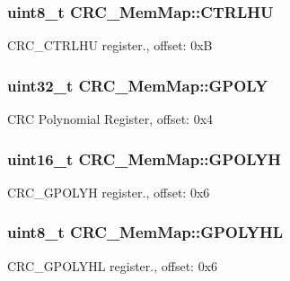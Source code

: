 \subsubsection[{C\+T\+R\+L\+H\+U}]{\setlength{\rightskip}{0pt plus 5cm}uint8\+\_\+t C\+R\+C\+\_\+\+Mem\+Map\+::\+C\+T\+R\+L\+H\+U}\label{struct_c_r_c___mem_map_a30abe06fea900d839a8558bd48e0a3a0}
C\+R\+C\+\_\+\+C\+T\+R\+L\+H\+U register., offset\+: 0x\+B \hypertarget{struct_c_r_c___mem_map_ab897251ee30cb234786a0f0a305f4620}{}
\subsubsection[{G\+P\+O\+L\+Y}]{\setlength{\rightskip}{0pt plus 5cm}uint32\+\_\+t C\+R\+C\+\_\+\+Mem\+Map\+::\+G\+P\+O\+L\+Y}\label{struct_c_r_c___mem_map_ab897251ee30cb234786a0f0a305f4620}
C\+R\+C Polynomial Register, offset\+: 0x4 \hypertarget{struct_c_r_c___mem_map_a423da9d8034f39564aedb877f7c5043b}{}
\subsubsection[{G\+P\+O\+L\+Y\+H}]{\setlength{\rightskip}{0pt plus 5cm}uint16\+\_\+t C\+R\+C\+\_\+\+Mem\+Map\+::\+G\+P\+O\+L\+Y\+H}\label{struct_c_r_c___mem_map_a423da9d8034f39564aedb877f7c5043b}
C\+R\+C\+\_\+\+G\+P\+O\+L\+Y\+H register., offset\+: 0x6 \hypertarget{struct_c_r_c___mem_map_a73effe5217fb833a57c7e84707e5ebe6}{}
\subsubsection[{G\+P\+O\+L\+Y\+H\+L}]{\setlength{\rightskip}{0pt plus 5cm}uint8\+\_\+t C\+R\+C\+\_\+\+Mem\+Map\+::\+G\+P\+O\+L\+Y\+H\+L}\label{struct_c_r_c___mem_map_a73effe5217fb833a57c7e84707e5ebe6}
C\+R\+C\+\_\+\+G\+P\+O\+L\+Y\+H\+L register., offset\+: 0x6 \hypertarget{struct_c_r_c___mem_map_ae7c166006427c82d21b88417313cf511}{}
